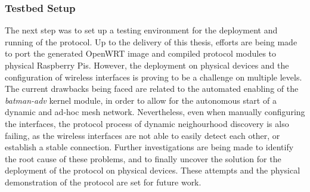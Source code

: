 \subsubsection{Testbed Setup} \label{sec:infrastructure:testbed}


The next step was to set up a testing environment for the deployment and running of the \pol{} protocol. Up to the delivery of this thesis, efforts are being made to port the generated OpenWRT image and compiled protocol modules to physical Raspberry Pis. However, the deployment on physical devices and the configuration of wireless interfaces is proving to be a challenge on multiple levels. The current drawbacks being faced are related to the automated enabling of the \emph{batman-adv} kernel module, in order to allow for the autonomous start of a dynamic and ad-hoc mesh network. Nevertheless, even when manually configuring the interfaces, the protocol process of dynamic neighourhood discovery is also failing, as the wireless interfaces are not able to easily detect each other, or establish a stable connection. Further investigations are being made to identify the root cause of these problems, and to finally uncover the solution for the deployment of the protocol on physical devices. These attempts and the physical demonstration of the \pol{} protocol are set for future work.

